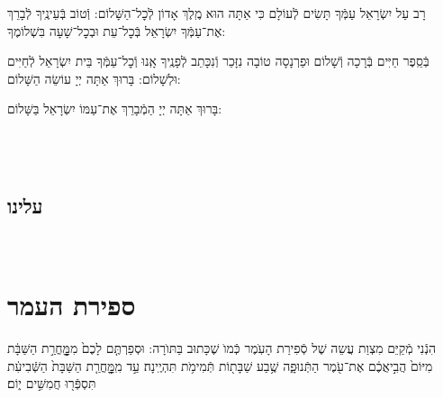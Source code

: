 \documentclass[twoside, openany, parskip=half, 11pt]{book}
\begin{document}
\maarivmodim

\alhanisim

\weekdaysahodos

רָב עַל יִשְׂרָאֵל עַמְּֿךָ תָּשִׂים לְֿעוֹלָם כִּי אַתָּה הוּא מֶֽלֶךְ אָדוֹן לְֿכׇל־הַשָּׁלוֹם: וְֿטוֹב בְּֿעֵינֶֽיךָ לְֿבָרֵךְ אֶת־עַמְּֿךָ יִשְׂרָאֵל בְּֿכׇל־עֵת וּבְכׇל־שָׁעָה בִּשְׁלוֹמֶךָ:
\vspace{-0.4\baselineskip}
\begin{paracol}{2}

\begin{small}
בְּֿסֵֽפֶר חַיִּים בְּֿרָכָה וְֿשָׁלוֹם וּפַרְנָסָה טוֹבָה נִזָּכֵר וְֿנִכָּתֵב לְֿפָנֶֽיךָ אָֽנוּ וְֿכׇל־עַמְּֿךָ בֵּית יִשְׂרָאֵל לְֿחַיִּים וּלְשָׁלוֹם: בָּרוּךְ אַתָּה יְיָ עוֹשֵׂה הַשָּׁלוֹם:

\end{small}
\switchcolumn
בָּרוּךְ אַתָּה יְיָ הַמְֿבָרֵךְ אֶת־עַמּוֹ יִשְׂרָאֵל בַּשָּׁלוֹם:

\end{paracol}



\tachanunim

\vspace{\baselineskip}

\fullkaddish

\vfill

\\
\\

\clearpage
\section*{ עלינו }

\aleinu


\vfill

\quad{}\quad{}\\

\chapter[ספירת העמר]{ ספירת העמר }
\label{sefiras haomer}

הִנְֿנִי מְֿקַיֵּם מִצְוַת עֲשֵה שֶׁל סְֿפִירַת הָעֽׂמֶר כְּֿמוׂ שֶׁכָּתוּב בַּתּוׂרָה: וּסְפַרְתֶּ֤ם לָכֶם֙ מִמׇׇׇׇׇׇָּחֳרַ֣ת הַשַּׁבָּ֔ת מִיּוֹם֙ הֲבִ֣יאֲכֶ֔ם אֶת־עֹ֖מֶר הַתְּֿנוּפָ֑ה שֶׁ֥בַע שַׁבָּת֖וֹת תְּֿמִימֹ֥ת תִּהְיֶֽינָה׃ עַ֣ד מִֽמׇׇׇׇׇׇָּחֳרַ֤ת הַשַּׁבָּת֙ הַשְּֿׁבִיעִ֔ת תִּסְפְּֿר֖וּ חֲמִשִּׁ֣ים י֑וֹם׃
\end{document}
